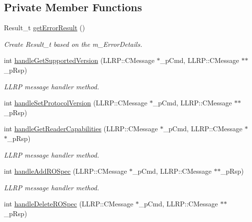 \subsection*{Private Member Functions}
\begin{DoxyCompactItemize}
\item 
Result\-\_\-t \hyperlink{class_e_l_f_i_n_1_1_l_l_r_p_core_ab4c1fdb043b0ee56c29e8c3973ef609d}{get\-Error\-Result} ()
\begin{DoxyCompactList}\small\item\em Create Result\-\_\-t based on the m\-\_\-\-Error\-Details. \end{DoxyCompactList}\end{DoxyCompactItemize}
{\bf }\par
\begin{DoxyCompactItemize}
\item 
int \hyperlink{class_e_l_f_i_n_1_1_l_l_r_p_core_a68fc07b9a02e9d81abaf3536d3be2bb3}{handle\-Get\-Supported\-Version} (L\-L\-R\-P\-::\-C\-Message $\ast$\-\_\-p\-Cmd, L\-L\-R\-P\-::\-C\-Message $\ast$$\ast$\-\_\-p\-Rsp)
\begin{DoxyCompactList}\small\item\em L\-L\-R\-P message handler method. \end{DoxyCompactList}\item 
int \hyperlink{class_e_l_f_i_n_1_1_l_l_r_p_core_a1e32c1a8d11bcf11f5d8143eac90fd91}{handle\-Set\-Protocol\-Version} (L\-L\-R\-P\-::\-C\-Message $\ast$\-\_\-p\-Cmd, L\-L\-R\-P\-::\-C\-Message $\ast$$\ast$\-\_\-p\-Rsp)
\item 
int \hyperlink{class_e_l_f_i_n_1_1_l_l_r_p_core_a6513619f9917762db82e6b145edada6d}{handle\-Get\-Reader\-Capabilities} (L\-L\-R\-P\-::\-C\-Message $\ast$\-\_\-p\-Cmd, L\-L\-R\-P\-::\-C\-Message $\ast$$\ast$\-\_\-p\-Rsp)
\begin{DoxyCompactList}\small\item\em L\-L\-R\-P message handler method. \end{DoxyCompactList}\item 
int \hyperlink{class_e_l_f_i_n_1_1_l_l_r_p_core_ada340ab8828c0e5cbe3252b63e23282c}{handle\-Add\-R\-O\-Spec} (L\-L\-R\-P\-::\-C\-Message $\ast$\-\_\-p\-Cmd, L\-L\-R\-P\-::\-C\-Message $\ast$$\ast$\-\_\-p\-Rsp)
\begin{DoxyCompactList}\small\item\em L\-L\-R\-P message handler method. \end{DoxyCompactList}\item 
int \hyperlink{class_e_l_f_i_n_1_1_l_l_r_p_core_a4512038068328877714c3c596e7785af}{handle\-Delete\-R\-O\-Spec} (L\-L\-R\-P\-::\-C\-Message $\ast$\-\_\-p\-Cmd, L\-L\-R\-P\-::\-C\-Message $\ast$$\ast$\-\_\-p\-Rsp)
$$
\end{DoxyCompactItemize}
